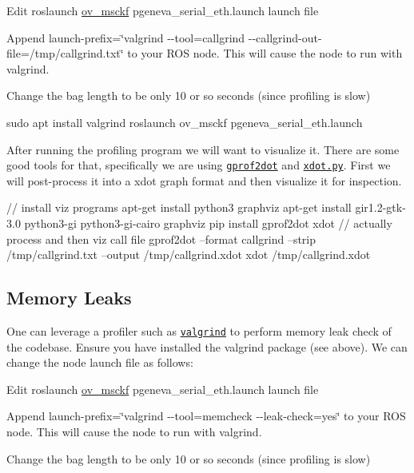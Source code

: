 \begin{DoxyItemize}
\item Edit {\ttfamily roslaunch \hyperlink{namespaceov__msckf}{ov\+\_\+msckf} pgeneva\+\_\+serial\+\_\+eth.\+launch} launch file
\item Append {\ttfamily launch-\/prefix=\char`\"{}valgrind -\/-\/tool=callgrind -\/-\/callgrind-\/out-\/file=/tmp/callgrind.\+txt\char`\"{}} to your R\+OS node. This will cause the node to run with valgrind.
\item Change the bag length to be only 10 or so seconds (since profiling is slow)
\end{DoxyItemize}


\begin{DoxyCode}
sudo apt install valgrind
roslaunch ov\_msckf pgeneva\_serial\_eth.launch
\end{DoxyCode}


After running the profiling program we will want to visualize it. There are some good tools for that, specifically we are using \href{https://github.com/jrfonseca/gprof2dot}{\tt gprof2dot} and \href{https://github.com/jrfonseca/xdot.py}{\tt xdot.\+py}. First we will post-\/process it into a xdot graph format and then visualize it for inspection.




\begin{DoxyCode}
// install viz programs
apt-get install python3 graphviz
apt-get install gir1.2-gtk-3.0 python3-gi python3-gi-cairo graphviz
pip install gprof2dot xdot
// actually process and then viz call file
gprof2dot --format callgrind --strip /tmp/callgrind.txt --output /tmp/callgrind.xdot
xdot /tmp/callgrind.xdot
\end{DoxyCode}
\hypertarget{dev-profiling_dev-profiling-leaks}{}\subsection{Memory Leaks}\label{dev-profiling_dev-profiling-leaks}
One can leverage a profiler such as \href{https://www.valgrind.org/}{\tt valgrind} to perform memory leak check of the codebase. Ensure you have installed the {\ttfamily valgrind} package (see above). We can change the node launch file as follows\+:


\begin{DoxyItemize}
\item Edit {\ttfamily roslaunch \hyperlink{namespaceov__msckf}{ov\+\_\+msckf} pgeneva\+\_\+serial\+\_\+eth.\+launch} launch file
\item Append {\ttfamily launch-\/prefix=\char`\"{}valgrind -\/-\/tool=memcheck -\/-\/leak-\/check=yes\char`\"{}} to your R\+OS node. This will cause the node to run with valgrind.
\item Change the bag length to be only 10 or so seconds (since profiling is slow)
\end{DoxyItemize}

